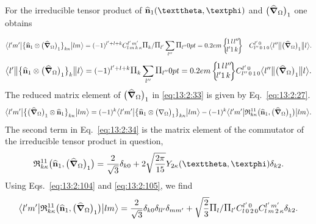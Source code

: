 For the irreducible tensor product of \(\widehat{\vect{n}}_{1}(\vartheta, \varphi)\) and \(\bigl(\widehat{\boldsymbol{\nabla}}_{\Omega}\bigr)_{1}\) one obtains

\begin{equation}
\braOket{ l^{\prime} m^{\prime}}{\bigl\{\widehat{\vect{n}}_{1} \otimes\bigl(\delop_{\Omega}\bigr)_{1}\bigr\}_{k \kappa}}{l m}=(-1)^{l^{\prime}+l+k} 
\clebsch{l}{m}{k}{\kappa}{l^{\prime}}{m^{\prime}} \Fact{k}/\Fact{l^\prime} \sum_{l^{\prime \prime}} \Fact{l^{\prime \prime}}
\sixj{1}{l}{l^{\prime \prime}}{l^\prime}{1}{k} \quad
\clebsch{l^{\prime\prime}}{0}{1}{0}{l^{\prime}}{0}
\braOketred{ l^{\prime \prime}}{\bigl(\delop_{\Omega}\bigr)_{1}}{ l} .\label{eq:13:2:33}
\end{equation}
\begin{equation*}
\braOketred{ l^{\prime}}{\bigl\{\widehat{\vect{n}}_{1} \otimes\bigl(\delop_{\Omega}\bigr)_{1}\bigr\}_{k}}{ l}=(-1)^{l^{\prime}+l+k} \Fact{k} \sum_{l^{\prime \prime}} \Fact{l^{\prime \prime}}
\sixj{1}{l}{l^{\prime \prime}}{l^\prime}{1}{k}
\clebsch{l^{\prime\prime}}{0}{1}{0}{l^{\prime}}{0}
\braOketred{ l^{\prime \prime}}{\bigl(\delop_{\Omega}\bigr)_{1}}{ l} .
\end{equation*}
The reduced matrix element of \(\bigl(\widehat{\boldsymbol{\nabla}}_{\Omega}\bigr)_{1}\) in \eqref{eq:13:2:33} is given by Eq.~\eqref{eq:13:2:27}.
\begin{equation}
\bigl\langle  l^{\prime} m^{\prime} \big| \bigl\{\bigl(\widehat{\boldsymbol{\nabla}}_{\Omega}\bigr)_{1} \otimes \widehat{\mathbf{n}}_{1}\bigr\}_{k \kappa} \big| l m \bigr\rangle=(-1)^{k}
\bigl\langle  l^{\prime} m^{\prime} \big| \bigl\{\widehat{\mathbf{n}}_{1} \otimes\bigl(\nabla_{\Omega}\bigr)_{1}\bigr\}_{k \kappa} \big| l m \bigr\rangle-(-1)^{k}
\bigl\langle  l^{\prime} m^{\prime} \big|  \mathfrak{R}_{k \kappa}^{11}\bigl(\widehat{\mathbf{n}}_{1},\bigl(\widehat{\boldsymbol{\nabla}}_{\Omega}\bigr)_{1}\bigr) \big| l m \bigr\rangle. \label{eq:13:2:34}
\end{equation}
The second term in Eq.~\eqref{eq:13:2:34} is the matrix element of the commutator of the irreducible tensor product in question,
\begin{equation}
\mathfrak{R}_{k \kappa}^{11}\bigl(\widehat{\vect{n}}_{1},\bigl(\delop_{\Omega}\bigr)_{1}\bigr)=\frac{2}{\sqrt{3}} \delta_{k 0}+2 \sqrt{\frac{2 \pi}{15}} Y_{2 \kappa}(\vartheta, \varphi) \delta_{k 2}. \label{eq:13:2:35}
\end{equation}
Using Eqs.~\eqref{eq:13:2:104} and \eqref{eq:13:2:105}, we find
\begin{equation}
\braOket{ l^{\prime} m^{\prime}}{ \mathfrak{R}_{k \kappa}^{11}\bigl(\widehat{\vect{n}}_{1},\bigl(\delop_{\Omega}\bigr)_{1}\bigr)}{l m}=\frac{2}{\sqrt{3}} \delta_{k 0} \delta_{l l^{\prime}} \delta_{m m^{\prime}}+\sqrt{\frac{2}{3}} \Fact{l}/\Fact{l^\prime}
\clebsch{l}{0}{2}{0}{l^{\prime}}{0}
\clebsch{l}{m}{2}{\kappa}{l^{\prime}}{m^{\prime}} \delta_{k 2}. \label{eq:13:2:36}
\end{equation}
